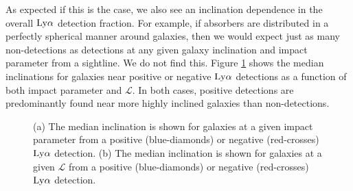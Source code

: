 \documentclass[twocolumn,tighten]{aastex62}
\begin{document}
As expected if this is the case, we also see an inclination dependence in the overall $\rm Ly\alpha$ detection fraction. For example, if absorbers are distributed in a perfectly spherical manner around galaxies, then we would expect just as many non-detections as detections at any given galaxy inclination and impact parameter from a sightline. We do not find this. Figure \ref{detection_fraction_inclination} shows the median inclinations for galaxies near positive or negative $\rm Ly\alpha$ detections as a function of both impact parameter and $\mathcal{L}$. In both cases, positive detections are predominantly found near more highly inclined galaxies than non-detections.



\begin{figure}
\centering
  \caption{\small{(a) The median inclination is shown for galaxies at a given impact parameter from a positive (blue-diamonds) or negative (red-crosses) $\rm Ly\alpha$ detection. (b) The median inclination is shown for galaxies at a given $\mathcal{L}$ from a positive (blue-diamonds) or negative (red-crosses) $\rm Ly\alpha$ detection.}}
  \label{detection_fraction_inclination}
\vspace{0pt}
\end{figure}
\end{document}
